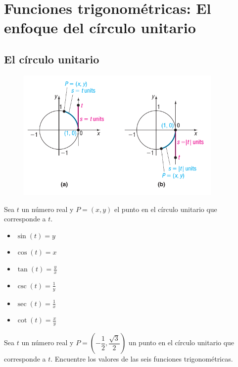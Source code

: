 	

\section{Funciones trigonométricas: El enfoque del círculo unitario}
\subsection{El círculo unitario}
{}
	\begin{figure}[h]
		\centering
		\includegraphics[width=10cm,keepaspectratio=true]{./trig/sull0618.png}
		\label{fig:0618}
	\end{figure}
	

{}
	\begin{defn}
		Sea $t$ un número real y $P=(x,y)$ el punto en el círculo unitario que corresponde a $t$.
		\begin{multicols}{2}
			\begin{itemize}
				\item $\sin(t)=y$
				\item $\cos(t)=x$
				\item $\tan(t)=\frac{y}{x}$
				\item $\csc(t)=\frac{1}{y}$
				\item $\sec(t)=\frac{1}{x}$
				\item $\cot(t)=\frac{x}{y}$
			\end{itemize}
		\end{multicols}
	\end{defn}

{}
	\begin{problema}
		\label{exmp:sull0601}
		Sea $t$ un número real y $P=\left(-\dfrac{1}{2}, \dfrac{\sqrt{3}}{2}  \right)$
		un punto en el círculo unitario que corresponde a $t$.  Encuentre los valores de las seis funciones trigonométricas.
	\end{problema}
	

